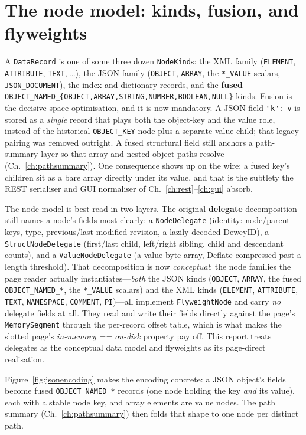 \documentclass[11pt,a4paper,oneside]{report}
\theoremstyle{sirixthm}
\newcommand{\code}[1]{\texttt{#1}}
\begin{document}
\section{The node model: kinds, fusion, and flyweights}

A \code{DataRecord} is one of some three dozen \code{NodeKind}s: the XML family (\code{ELEMENT},
\code{ATTRIBUTE}, \code{TEXT}, \ldots), the JSON family (\code{OBJECT}, \code{ARRAY}, the
\code{*\_VALUE} scalars, \code{JSON\_DOCUMENT}), the index and dictionary records, and the
\textbf{fused} \code{OBJECT\_NAMED\_\{OBJECT,ARRAY,STRING,NUMBER,BOOLEAN,NULL\}} kinds. Fusion is the
decisive space optimisation, and it is now mandatory. A JSON field \code{"k": v} is stored as a
\emph{single} record that plays both the object-key and the value role, instead of the historical
\code{OBJECT\_KEY} node plus a separate value child; that legacy pairing was removed outright. A
fused structural field still anchors a path-summary layer so that array and nested-object paths
resolve (Ch.~\ref{ch:pathsummary}). One consequence shows up on the wire: a fused key's children sit
as a bare array directly under its value, and that is the subtlety the REST serialiser and GUI
normaliser of Ch.~\ref{ch:rest}--\ref{ch:gui} absorb.

The node model is best read in two layers. The original \textbf{delegate} decomposition still names
a node's fields most clearly: a \code{NodeDelegate} (identity: node/parent keys, type,
previous/last-modified revision, a lazily decoded DeweyID), a \code{StructNodeDelegate} (first/last
child, left/right sibling, child and descendant counts), and a \code{ValueNodeDelegate} (a value byte
array, Deflate-compressed past a length threshold). That decomposition is now \emph{conceptual}: the
node families the page reader actually instantiates---\emph{both} the JSON kinds (\code{OBJECT},
\code{ARRAY}, the fused \code{OBJECT\_NAMED\_*}, the \code{*\_VALUE} scalars) and the XML kinds
(\code{ELEMENT}, \code{ATTRIBUTE}, \code{TEXT}, \code{NAMESPACE}, \code{COMMENT}, \code{PI})---all
implement \code{FlyweightNode} and carry \emph{no} delegate fields at all. They read and write their
fields directly against the page's \code{MemorySegment} through the per-record offset table, which is
what makes the slotted page's \emph{in-memory == on-disk} property pay off. This report treats
delegates as the conceptual data model and flyweights as its page-direct realisation.

Figure~\ref{fig:jsonencoding} makes the encoding concrete: a JSON object's fields become fused
\code{OBJECT\_NAMED\_*} records (one node holding the key \emph{and} its value), each with a stable node
key, and array elements are value nodes. The path summary (Ch.~\ref{ch:pathsummary}) then folds that
shape to one node per distinct path.
\end{document}
